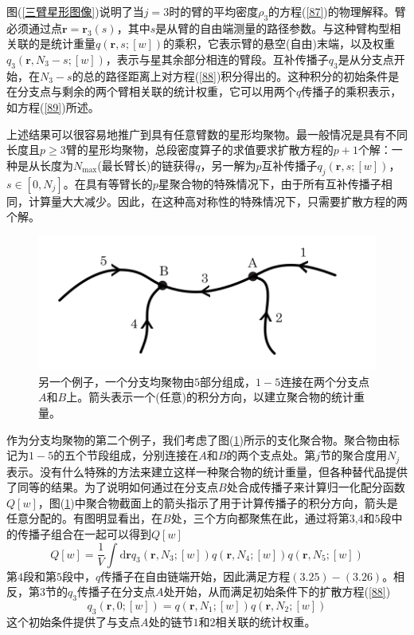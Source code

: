 图(\ref{三臂星形图像})说明了当$j=3$时的臂的平均密度$\rho _3$的方程(\ref{87})的物理解释。臂必须通过点$\mathbf{r}=\mathbf{r}_3(s)$，其中$s$是从臂的自由端测量的路径参数。与这种臂构型相关联的是统计重量$q(\mathbf{r},s;[w])$的乘积，它表示臂的悬空(自由)末端，以及权重$q_{3}(\mathbf{r},N_{3}-s;[w])$，表示与星其余部分相连的臂段。互补传播子$q_3$是从分支点开始，在$N_3-s$的总的路径距离上对方程(\ref{88})积分得出的。这种积分的初始条件是在分支点与剩余的两个臂相关联的统计权重，它可以用两个$q$传播子的乘积表示，如方程(\ref{89})所述。

上述结果可以很容易地推广到具有任意臂数的星形均聚物。最一般情况是具有不同长度且$p\geq3$臂的星形均聚物，总段密度算子的求值要求扩散方程的$p+1$个解：一种是从长度为$N_{\max}$(最长臂长)的链获得$q$，另一解为$p$互补传播子$q_j(\mathbf{r},s;[w])$，$s\in [0,N_j]$。在具有等臂长的$p$星聚合物的特殊情况下，由于所有互补传播子相同，计算量大大减少。因此，在这种高对称性的特殊情况下，只需要扩散方程的两个解。

\begin{figure}[H]
\centering
\includegraphics[scale=0.7]{./figures/36.png}
\caption{另一个例子，一个分支均聚物由$5$部分组成，$1-5$连接在两个分支点$A$和$B$上。箭头表示一个(任意)的积分方向，以建立聚合物的统计重量。}
\label{AB嵌段}
\end{figure}

作为分支均聚物的第二个例子，我们考虑了图(\ref{AB嵌段})所示的支化聚合物。聚合物由标记为$1-5$的五个节段组成，分别连接在$A$和$B$的两个支点处。第$j$节的聚合度用$N_j$表示。没有什么特殊的方法来建立这样一种聚合物的统计重量，但各种替代品提供了同等的结果。为了说明如何通过在分支点$B$处合成传播子来计算归一化配分函数$Q[w]$，图(\ref{AB嵌段})中聚合物截面上的箭头指示了用于计算传播子的积分方向，箭头是任意分配的。有图明显看出，在$B$处，三个方向都聚焦在此，通过将第$3$,$4$和$5$段中的传播子组合在一起可以得到$Q[w]$
\begin{equation}
Q[w]=\frac{1}{V}\int \mathrm{d}\mathbf{r}q_3(\mathbf{r},N_3;[w])q(\mathbf{r},N_4;[w])q(\mathbf{r},N_5;[w])
\end{equation}
第$4$段和第$5$段中，$q$传播子在自由链端开始，因此满足方程$(3.25)-(3.26)$。相反，第3节的$q_3$传播子在分支点$A$处开始，从而满足初始条件下的扩散方程(\ref{88})
\begin{equation}
q_3(\mathbf{r},0;[w])=q(\mathbf{r},N_1;[w])q(\mathbf{r},N_2;[w])
\end{equation}
这个初始条件提供了与支点$A$处的链节$1$和$2$相关联的统计权重。

